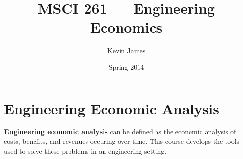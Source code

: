 \documentclass[12pt]{article}
\begin{document}
\title{MSCI 261 --- Engineering Economics}
\author{Kevin James}
\date{\vspace{-2ex}Spring 2014}
\maketitle\HRule

\section{Engineering Economic Analysis}
{\bf Engineering economic analysis} can be defined as the economic analysis of costs, benefits, and revenues occuring over time. This course develops the tools used to solve these problems in an engineering setting.
\end{document}
